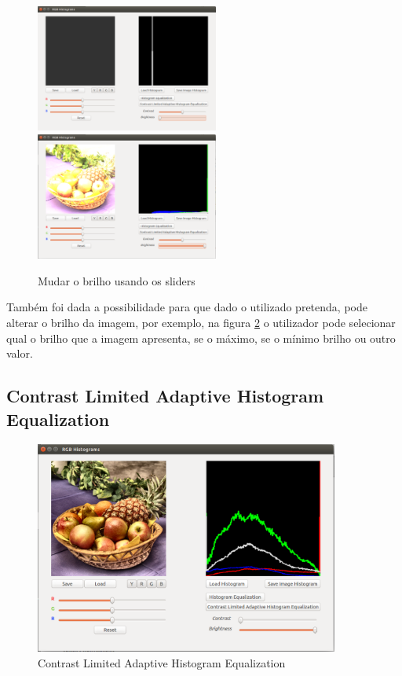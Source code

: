 \documentclass[pdftex,12pt,a4paper]{report}
\begin{document}
\begin{figure}[!htb]
\center
 \includegraphics[width=60mm,scale=1]{imagens/low_brigh.png}
 \includegraphics[width=60mm,scale=1]{imagens/high_brigh.png}
 \caption{Mudar o brilho usando os sliders}
 \label{fig:brilho}
\end{figure}

Também foi dada a possibilidade para que dado o utilizado pretenda, pode alterar o brilho da imagem, por exemplo, na figura \ref{fig:brilho} o utilizador pode selecionar qual o brilho que a imagem apresenta, se o máximo, se o mínimo brilho ou outro valor.

\subsection{Contrast Limited Adaptive Histogram Equalization}

\begin{figure}[!htb]
\center
 \includegraphics[width=100mm,scale=1]{imagens/window_contrast_limited_ada_contrast.png}
 \caption{Contrast Limited Adaptive Histogram Equalization}
 \label{fig:brilho}
\end{figure}
\end{document}
